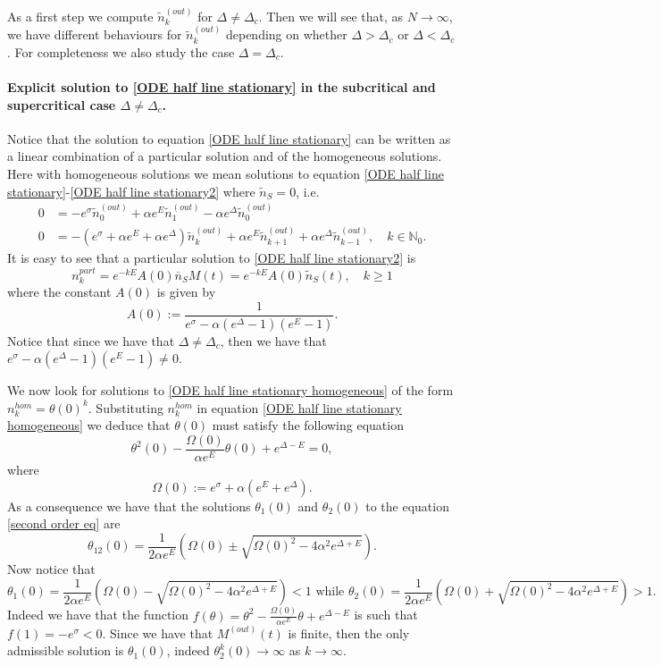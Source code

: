 \documentclass{article}
\numberwithin{equation}{section}
\theoremstyle{plain}
\begin{document}
As a first step we compute $\tilde{n}_k^{(out)}$ for $\Delta \neq \Delta_c$.
Then we will see that, as $N \to \infty$, we have different behaviours for $\tilde{n}_k^{(out)}$ depending on whether $\Delta> \Delta_c$ or $\Delta < \Delta_c $. 
For completeness we also study the case $\Delta = \Delta_c$.
\paragraph{Explicit solution to \eqref{ODE half line stationary} in the subcritical and supercritical case $\Delta \neq \Delta_c $.}
Notice that the solution to equation \eqref{ODE half line stationary} can be written as a linear combination of a particular solution and of the homogeneous solutions. Here with homogeneous solutions we mean solutions to equation \eqref{ODE half line stationary}-\eqref{ODE half line stationary2} where $\tilde{n}_S=0$, i.e. 
\begin{align} \label{ODE half line stationary homogeneous}
   0 &= - e^{\sigma } \tilde{n}_0^{(out)} + \alpha e^E \tilde{n}_1^{(out)} - \alpha e^{\Delta} \tilde{n}_0^{(out)} \\
        0 &= - \left( e^{\sigma } + \alpha e^E + \alpha e^\Delta  \right)  \tilde{n}_k^{(out)} + \alpha e^E \tilde{n}_{k+1}^{(out)}  + \alpha e^{\Delta} \tilde{n}_{k-1}^{(out)}, \quad k \in \mathbb N_0. \nonumber
\end{align}
It is easy to see that a particular solution to \eqref{ODE half line stationary2} is 
\[ 
n_k^{part} = e^{- k E } A(0)  \overline n_S M(t) = e^{- k E } A(0) \tilde{n}_S(t) , \quad  k \geq 1 
\] 
where the constant $A(0)$ is given by 
\[
A(0):= \frac{1}{e^\sigma - \alpha (e^\Delta-1) ( e^E-1 )}. 
\]
Notice that since we have that $\Delta \neq \Delta_c $, then we have that $e^\sigma - \alpha (e^\Delta-1) ( e^E-1 ) \neq 0.$

We now look for solutions to \eqref{ODE half line stationary homogeneous} of the form $n_k^{hom} = \theta(0)^k$. Substituting $n_k^{hom} $ in equation \eqref{ODE half line stationary homogeneous} we deduce that $\theta(0) $ must satisfy the following equation 
\begin{equation}\label{second order eq}
\theta^2 (0)- \frac{\Omega(0)}{\alpha e^E} \theta (0) + e^{\Delta - E} =0, 
\end{equation}
where 
\[
\Omega (0):= e^\sigma + \alpha (e^E + e^\Delta).
\] 
As a consequence we have that the solutions $\theta_{1}(0)$ and $\theta_2(0)$ to the equation \eqref{second order eq} are
\[
\theta_{12}(0)= \frac{1}{2 \alpha e^E } \left(  \Omega(0) \pm  \sqrt{\Omega(0)^2 - 4 \alpha^2  e^{\Delta + E} } \right). 
\]
Now notice that 
\[
\theta_1 (0)= \frac{1}{2 \alpha e^E } \left(  \Omega(0) -  \sqrt{\Omega(0)^2 - 4 \alpha^2  e^{\Delta + E} } \right) < 1 \text{ while } \theta_2 (0)= \frac{1}{2 \alpha e^E } \left(  \Omega(0) +  \sqrt{\Omega(0)^2 - 4 \alpha^2  e^{\Delta + E} } \right) > 1. 
\]
Indeed we have that the function $f(\theta)=\theta^2- \frac{\Omega(0)}{\alpha e^E} \theta  + e^{\Delta - E}$ is such that $f(1)=- e^\sigma< 0$. 
Since we have that $M^{(out)} (t) $ is finite, then the only admissible solution is $\theta_1(0)$, indeed $\theta_2^k(0) \rightarrow \infty $ as $k \to \infty $. 
\end{document}
